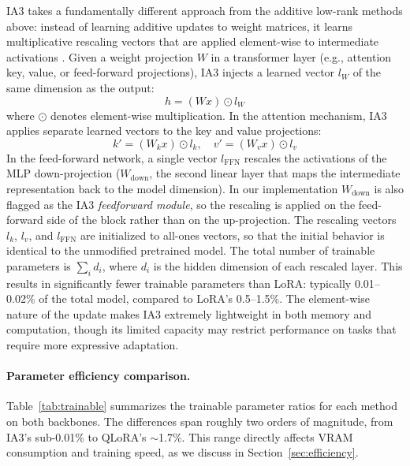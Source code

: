 \documentclass{article}
\begin{document}
IA3 takes a fundamentally different approach from the additive low-rank methods above: instead of learning additive updates to weight matrices, it learns multiplicative rescaling vectors that are applied element-wise to intermediate activations \cite{liu2022ia3}. Given a weight projection $W$ in a transformer layer (e.g., attention key, value, or feed-forward projections), IA3 injects a learned vector $l_W$ of the same dimension as the output:
\begin{equation}
\label{eq:ia3_rescale}
h = (W x) \odot l_W
\end{equation}
where $\odot$ denotes element-wise multiplication. In the attention mechanism, IA3 applies separate learned vectors to the key and value projections:
\begin{equation}
\label{eq:ia3_attn}
k' = (W_k x) \odot l_k, \quad v' = (W_v x) \odot l_v
\end{equation}
In the feed-forward network, a single vector $l_{\text{FFN}}$ rescales the activations of the MLP down-projection ($W_{\text{down}}$, the second linear layer that maps the intermediate representation back to the model dimension). In our implementation $W_{\text{down}}$ is also flagged as the IA3 \emph{feedforward module}, so the rescaling is applied on the feed-forward side of the block rather than on the up-projection. The rescaling vectors $l_k$, $l_v$, and $l_{\text{FFN}}$ are initialized to all-ones vectors, so that the initial behavior is identical to the unmodified pretrained model. The total number of trainable parameters is $\sum_i d_i$, where $d_i$ is the hidden dimension of each rescaled layer. This results in significantly fewer trainable parameters than LoRA: typically 0.01--0.02\% of the total model, compared to LoRA's 0.5--1.5\%. The element-wise nature of the update makes IA3 extremely lightweight in both memory and computation, though its limited capacity may restrict performance on tasks that require more expressive adaptation.

\paragraph{Parameter efficiency comparison.}
Table~\ref{tab:trainable} summarizes the trainable parameter ratios for each method on both backbones. The differences span roughly two orders of magnitude, from IA3's sub-0.01\% to QLoRA's $\sim$1.7\%. This range directly affects VRAM consumption and training speed, as we discuss in Section~\ref{sec:efficiency}.
\end{document}
